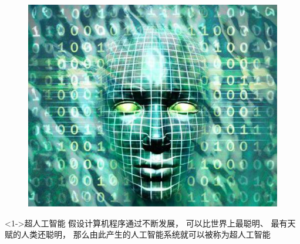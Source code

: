 \documentclass[10pt,aspectratio=43,mathserif,table]{beamer}
\begin{document}
\begin{frame}[allowframebreaks]
	\framebreak
	\begin{figure}[htbp]
		\centering
		\includegraphics[scale=0.25]{figures/tianwang.jpg}
	\end{figure}
	\begin{block}<1->{超人工智能}
		假设计算机程序通过不断发展， 可以比世界上最聪明、 最有天赋的人类还聪明， 那么由此产生的人工智能系统就可以被称为超人工智能
	\end{block}
\end{frame}
\end{document}

